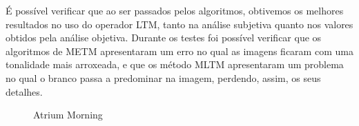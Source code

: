 \documentclass[conference]{IEEEtran}
\begin{document}
É possível verificar que ao ser passados pelos algoritmos, obtivemos os melhores resultados no uso do operador LTM, tanto na análise subjetiva quanto nos valores obtidos pela análise objetiva. Durante os testes foi possível verificar que os algoritmos de METM apresentaram um erro no qual as imagens ficaram com uma tonalidade mais arroxeada, e que os método MLTM apresentaram um problema no qual o branco passa a predominar na imagem, perdendo, assim, os seus detalhes.

\begin{figure}[!htp]
   \centering
    \hspace{0.3cm}
  \hspace{0.3cm}
    \hspace{0.3cm}
    \caption{Atrium Morning \cite{HDR_Dataset}}
    \label{fig:atMorn}
\end{figure}
\end{document}
